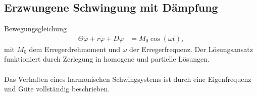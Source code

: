 \subsection{Erzwungene Schwingung mit Dämpfung}
Bewegungsgleichung
\begin{align} 
        \Theta \ddot{\varphi }+r\dot{\varphi }+D\varphi &=M_0\cos \left(\omega t\right)
,\end{align} 
mit $M_0$ dem Erregerdrehmoment und $\omega $ der Erregerfrequenz. 
Der Lösungsansatz funktioniert durch Zerlegung in homogene und partielle Lösungen.\\\\
Das Verhalten eines harmonischen Schwingsystems ist durch eine Eigenfrequenz und Güte vollständig beschrieben.
